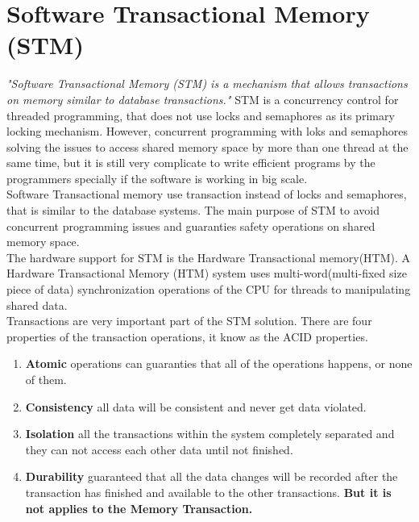 \documentclass[12pt]{article}
\begin{document}
\clearpage
\section{Software Transactional Memory (STM)}
\textit{"Software Transactional Memory (STM) is a mechanism that allows transactions on memory similar to database transactions."}\cite{Haskell}
STM is a concurrency control for threaded programming, that does not use locks and semaphores as its primary locking mechanism. However, concurrent programming with loks and semaphores solving the issues to access shared memory space by more than one thread at the same time, but it is still very complicate to write efficient programs by the programmers specially if the software is working in big scale.\\

Software Transactional memory use transaction instead of locks and semaphores, that is similar to the database systems. The main purpose of STM to avoid concurrent programming issues and guaranties safety operations on shared memory space.\cite{Kasper}\\

The hardware support for STM is the Hardware Transactional memory(HTM).
A Hardware Transactional Memory (HTM) system uses multi-word(multi-fixed size piece of data) synchronization operations of the CPU for threads to manipulating shared data.\\

{\setlength{\parindent}{0cm}
Transactions are very important part of the STM solution.  
There are four properties of the transaction operations, it know as the ACID properties.}
\begin{enumerate}
\item \textbf{Atomic} operations can guaranties that all of the operations happens, or none of them.
\item \textbf{Consistency} all data will be consistent and never get data violated.
\item \textbf{Isolation} all the transactions within the system completely separated and they can not access each other data until not finished. 
\item \textbf{Durability} guaranteed that all the data changes will be recorded after the transaction has finished and available to the other transactions. \textbf{But it is not applies to the Memory Transaction.}
\end{enumerate}
\end{document}

